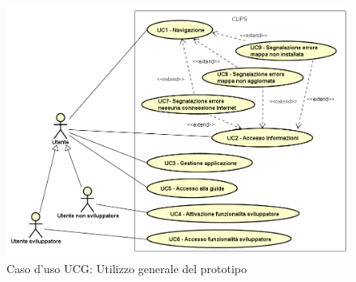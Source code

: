 \documentclass[../AnalisiDeiRequisiti.tex]{subfiles}
\begin{document}
        \begin{figure}[H]
            \centering
            \includegraphics[scale=0.95, width=\textwidth]{img/UCG.png}
            \caption{Caso d'uso UCG: Utilizzo generale del prototipo}\label{fig:UCG} 
        \end{figure}
\end{document}
